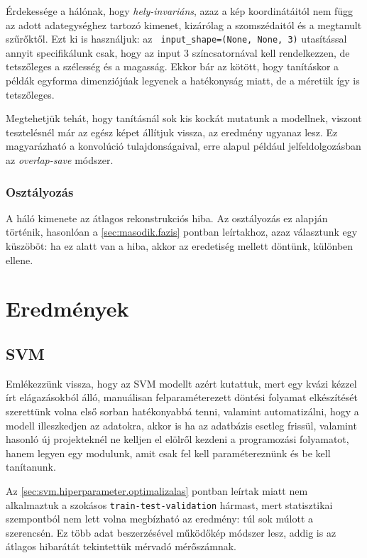 Érdekessége a hálónak, hogy \textit{hely-invariáns}, azaz a kép koordinátáitól nem függ az adott
adategységhez tartozó kimenet, kizárólag a szomszédaitól és a megtanult szűrőktől.
Ezt ki is használjuk: az \texttt{ input\_shape=(None, None, 3)} utasítással annyit
specifikálunk csak, hogy az input 3 színcsatornával kell rendelkezzen, de tetszőleges
a szélesség és a magasság. Ekkor bár az kötött, hogy tanításkor a példák egyforma 
dimenziójúak legyenek a hatékonyság miatt, de a méretük így is tetszőleges.


Megtehetjük tehát, hogy tanításnál sok kis kockát mutatunk a modellnek, viszont tesztelésnél
már az egész képet állítjuk vissza, az eredmény ugyanaz lesz. Ez magyarázható a konvolúció 
tulajdonságaival, erre alapul például jelfeldolgozásban az \textit{overlap-save} módszer.



\subsubsection{Osztályozás}

A háló kimenete az átlagos rekonstrukciós hiba. Az osztályozás ez alapján történik,
hasonlóan a \ref{sec:masodik.fazis} pontban leírtakhoz, azaz választunk egy küszöböt:
ha ez alatt van a hiba, akkor az eredetiség mellett döntünk, különben ellene.



\newpage
\section{Eredmények}

\subsection{SVM}

Emlékezzünk vissza, hogy az SVM modellt azért kutattuk, mert egy kvázi kézzel írt elágazásokból 
álló, manuálisan felparaméterezett döntési folyamat elkészítését szerettünk volna első sorban
hatékonyabbá tenni, valamint automatizálni, hogy a modell illeszkedjen az adatokra, akkor is ha az 
adatbázis esetleg frissül, valamint hasonló új projekteknél ne kelljen el elölről kezdeni a programozási
folyamatot, hanem legyen egy modulunk, amit csak fel kell paramétereznünk és be kell tanítanunk.


Az \ref{sec:svm.hiperparameter.optimalizalas} pontban leírtak miatt nem alkalmaztuk a szokásos 
\texttt{train-test-validation} hármast, mert statisztikai szempontból nem lett volna megbízható
az eredmény: túl sok múlott a szerencsén. Ez több adat beszerzésével működőkép módszer lesz,
addig is az átlagos hibarátát tekintettük mérvadó mérőszámnak.

